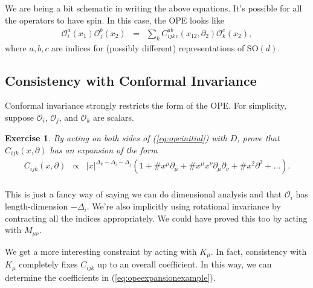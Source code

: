 \documentclass{ws-rv9x6}
\newcommand\be{\begin{eqnarray}}
\newcommand\ee{\end{eqnarray}}
\newcommand\cO{\mathcal{O}}
\newcommand\p[1]{\left(#1\right)}
\newcommand\ptl\partial
\newcommand\<\langle
\renewcommand\>\rangle
\newcommand\nn{\nonumber}
\renewcommand\.{\cdot}
\newcommand\SO{\mathrm{SO}}
\newcommand\De{\Delta}
\newtheorem{exercise}{Exercise}[section]
\begin{document}
We are being a bit schematic in writing the above equations.  It's possible for all the operators to have spin.  In this case, the OPE looks like
\be
\cO_i^a(x_1)\cO_j^b(x_2) &=& \sum_k C_{ijk}^{ab}{}_c(x_{12},\ptl_2)\cO_k^c(x_2),
\ee
where $a,b,c$ are indices for (possibly different) representations of $\SO(d)$.

\subsection{Consistency with Conformal Invariance}

Conformal invariance strongly restricts the form of the OPE\@.  For simplicity, suppose $\cO_i$, $\cO_j$, and $\cO_k$ are scalars.  
\begin{exercise}
By acting on both sides of (\ref{eq:opeinitial}) with $D$, prove that $C_{ijk}(x,\ptl)$ has an expansion of the form
\be
\label{eq:opeexpansionexample}
C_{ijk}(x,\ptl) &\propto& |x|^{\De_k-\De_i-\De_j}\p{1 +\# x^\mu\ptl_\mu + \# x^\mu x^\nu\ptl_\mu\ptl_\nu+\# x^2 \ptl^2 + \dots}.\nn\\
\ee
\end{exercise}
This is just a fancy way of saying we can do dimensional analysis and that $\cO_i$ has length-dimension $-\De_i$. We're also implicitly using rotational invariance by contracting all the indices appropriately. We could have proved this too by acting with $M_{\mu\nu}$.

We get a more interesting constraint by acting with $K_\mu$. In fact, consistency with $K_\mu$ completely fixes $C_{ijk}$ up to an overall coefficient. In this way, we can determine the coefficients in (\ref{eq:opeexpansionexample}).
\end{document}
